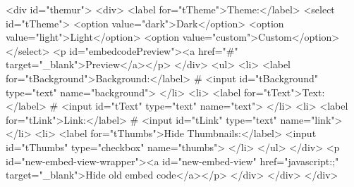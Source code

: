             <div id="themur">
                <div>
                    <label for="tTheme">Theme:</label>
                    <select id="tTheme">
                        <option value="dark">Dark</option>
                        <option value="light">Light</option>
                        <option value="custom">Custom</option>
                    </select>
                    <p id="embedcodePreview"><a href="#" target="_blank">Preview</a></p>
                </div>
                <ul>
                    <li>
                        <label for="tBackground">Background:</label> # <input id="tBackground" type="text" name="background">
                    </li>
                    <li>
                        <label for="tText">Text:</label> # <input id="tText" type="text" name="text">
                    </li>
                    <li>
                        <label for="tLink">Link:</label> # <input id="tLink" type="text" name="link">
                    </li>
                    <li>
                        <label for="tThumbs">Hide Thumbnails:</label> <input id="tThumbs" type="checkbox" name="thumbs">
                    </li>
                </ul>
            </div>
            <p id="new-embed-view-wrapper"><a id="new-embed-view" href="javascript:;" target="_blank">Hide old embed code</a></p>
        </div>
    </div>
</div>

